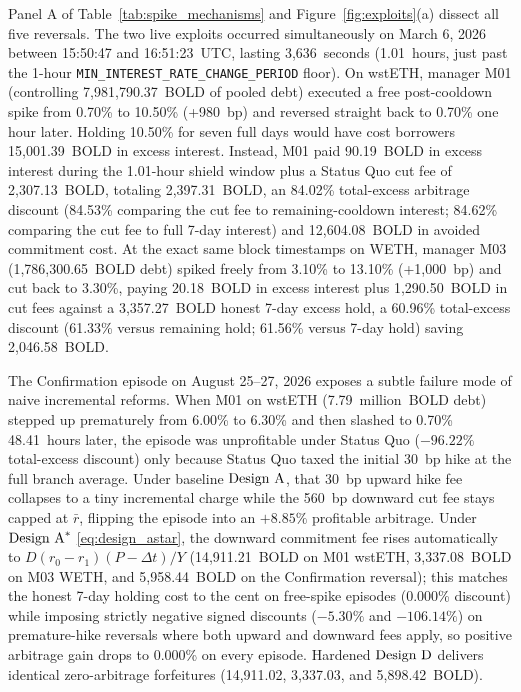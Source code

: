 Panel A of Table~\ref{tab:spike_mechanisms} and Figure~\ref{fig:exploits}(a) dissect all five reversals. The two live exploits occurred simultaneously on March 6, 2026 between 15:50:47 and 16:51:23~UTC, lasting 3,636~seconds (1.01~hours, just past the 1-hour \texttt{MIN\_INTEREST\_RATE\_CHANGE\_PERIOD} floor). On wstETH, manager M01 (controlling 7,981,790.37~BOLD of pooled debt) executed a free post-cooldown spike from 0.70\% to 10.50\% (+980~bp) and reversed straight back to 0.70\% one hour later. Holding 10.50\% for seven full days would have cost borrowers 15,001.39~BOLD in excess interest. Instead, M01 paid 90.19~BOLD in excess interest during the 1.01-hour shield window plus a Status Quo cut fee of 2,307.13~BOLD, totaling 2,397.31~BOLD, an 84.02\% total-excess arbitrage discount (84.53\% comparing the cut fee to remaining-cooldown interest; 84.62\% comparing the cut fee to full 7-day interest) and 12,604.08~BOLD in avoided commitment cost. At the exact same block timestamps on WETH, manager M03 (1,786,300.65~BOLD debt) spiked freely from 3.10\% to 13.10\% (+1,000~bp) and cut back to 3.30\%, paying 20.18~BOLD in excess interest plus 1,290.50~BOLD in cut fees against a 3,357.27~BOLD honest 7-day excess hold, a 60.96\% total-excess discount (61.33\% versus remaining hold; 61.56\% versus 7-day hold) saving 2,046.58~BOLD.

The Confirmation episode on August 25--27, 2026 exposes a subtle failure mode of naive incremental reforms. When M01 on wstETH (7.79~million~BOLD debt) stepped up prematurely from 6.00\% to 6.30\% and then slashed to 0.70\% 48.41~hours later, the episode was unprofitable under Status Quo ($-96.22\%$ total-excess discount) only because Status Quo taxed the initial 30~bp hike at the full branch average. Under baseline $\text{Design A}$, that 30~bp upward hike fee collapses to a tiny incremental charge while the 560~bp downward cut fee stays capped at $\bar{r}$, flipping the episode into an $+8.85\%$ profitable arbitrage. Under $\text{Design A}^*$ \eqref{eq:design_astar}, the downward commitment fee rises automatically to $D(r_0 - r_1)(P - \Delta t)/Y$ (14,911.21~BOLD on M01 wstETH, 3,337.08~BOLD on M03 WETH, and 5,958.44~BOLD on the Confirmation reversal); this matches the honest 7-day holding cost to the cent on free-spike episodes (0.000\% discount) while imposing strictly negative signed discounts ($-5.30\%$ and $-106.14\%$) on premature-hike reversals where both upward and downward fees apply, so positive arbitrage gain drops to 0.000\% on every episode. Hardened $\text{Design D}$ delivers identical zero-arbitrage forfeitures (14,911.02, 3,337.03, and 5,898.42~BOLD).


